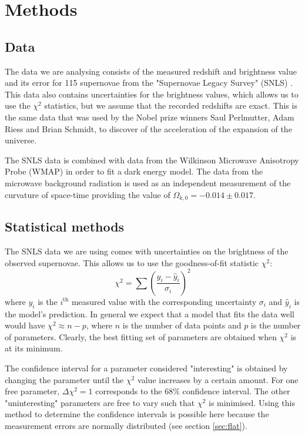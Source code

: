 \documentclass[11pt]{article}
\begin{document}
\section{Methods}
\subsection{Data} \label{sec:data}
The data we are analysing consists of the measured redshift and brightness value and its error for 115 supernovae from the "Supernovae Legacy Survey" (SNLS) \cite{SN_legacy_survey}. This data also contains uncertainties for the brightness values, which allows us to use the $\chi^2$ statistics, but we assume that the recorded redshifts are exact. This is the same data that was used by the Nobel prize winners Saul Perlmutter, Adam Riess and Brian Schmidt, to discover of the acceleration of the expansion of the universe. 

The SNLS data is combined with data from the Wilkinson Microwave Anisotropy Probe (WMAP) \cite{WMAP} in order to fit a dark energy model. The data from the microwave background radiation is used as an independent measurement of the curvature of space-time providing the value of $\Omega_{k,0}  = -0.014 \pm 0.017$.


\subsection{Statistical methods} \label{sec:stats}
The SNLS data we are using comes with uncertainties on the brightness of the observed supernovae. This allows us to use the goodness-of-fit statistic $\chi^2$:
\begin{equation}
	\chi^2 = \sum \left(\frac{y_i - \hat y_i}{\sigma_i}\right)^2
	\label{eq:chisq}
\end{equation}
where $y_i$ is the $i^{\mathrm{th}}$ measured value with the corresponding uncertainty $\sigma_i$ and $\hat y_i$ is the model's prediction. In general we expect that a model that fits the data well would have $\chi^2 \approx n - p$, where $n$ is the number of data points and $p$ is the number of parameters. Clearly, the best fitting set of parameters are obtained when $\chi^2$ is at its minimum. 

The confidence interval for a parameter considered "interesting" is obtained by changing the parameter until the $\chi^2$ value increases by a certain amount. For one free parameter, $\Delta \chi^2 = 1$ corresponds to the 68\% confidence interval. The other "uninteresting" parameters are free to vary such that $\chi^2$ is minimised. Using this method to determine the confidence intervals is possible here because the measurement errors are normally distributed (see section \ref{sec:flat}). 
\end{document}
